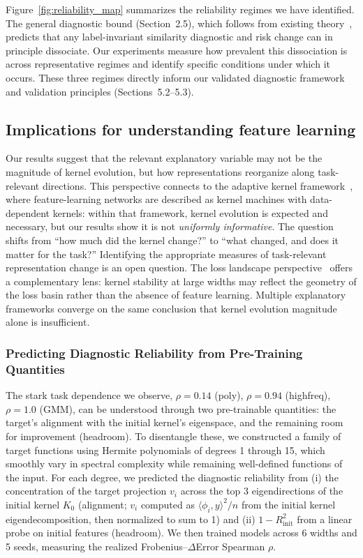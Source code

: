 \documentclass[twoside,11pt]{article}
\begin{document}
Figure~\ref{fig:reliability_map} summarizes the reliability regimes we have identified.  The general diagnostic bound (Section~2.5), which follows from existing theory~\citep{canatar2021spectral}, predicts that any label-invariant similarity diagnostic and risk change can in principle dissociate.  Our experiments measure how prevalent this dissociation is across representative regimes and identify specific conditions under which it occurs. These three regimes directly inform our validated diagnostic framework and validation principles (Sections~5.2--5.3).

\subsection{Implications for understanding feature learning}

Our results suggest that the relevant explanatory variable may not be the magnitude of kernel evolution, but how representations reorganize along task-relevant directions.  This perspective connects to the adaptive kernel framework~\citep{lauditi2025adaptive}, where feature-learning networks are described as kernel machines with data-dependent kernels: within that framework, kernel evolution is expected and necessary, but our results show it is not \emph{uniformly informative}.  The question shifts from ``how much did the kernel change?'' to ``what changed, and does it matter for the task?''  Identifying the appropriate measures of task-relevant representation change is an open question.  The loss landscape perspective~\citep{fort2019deep} offers a complementary lens: kernel stability at large widths may reflect the geometry of the loss basin rather than the absence of feature learning. Multiple explanatory frameworks converge on the same conclusion that kernel evolution magnitude alone is insufficient.

\subsubsection{Predicting Diagnostic Reliability from Pre-Training Quantities}

The stark task dependence we observe, $\rho=0.14$ (poly), $\rho=0.94$ (highfreq), $\rho=1.0$ (GMM), can be understood through two pre-trainable quantities: the target's alignment with the initial kernel's eigenspace, and the remaining room for improvement (headroom). To disentangle these, we constructed a family of target functions using Hermite polynomials of degrees 1 through 15, which smoothly vary in spectral complexity while remaining well-defined functions of the input. For each degree, we predicted the diagnostic reliability from (i) the concentration of the target projection $v_i$ across the top 3 eigendirections of the initial kernel $K_0$ (alignment; $v_i$ computed as $\langle \phi_i, y\rangle^2 / n$ from the initial kernel eigendecomposition, then normalized to sum to 1) and (ii) $1-R^2_{\text{init}}$ from a linear probe on initial features (headroom). We then trained models across 6 widths and 5 seeds, measuring the realized Frobenius--$\Delta$Error Spearman $\rho$.
\end{document}
